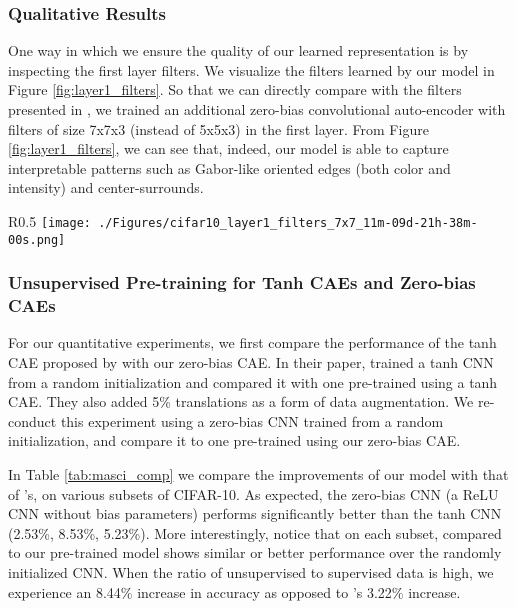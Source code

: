 \documentclass{article} \usepackage{iclr2015,times}
\begin{document}
\subsubsection{Qualitative Results}
One way in which we ensure the quality of our learned representation is by inspecting the first layer filters. We visualize the filters learned by our model in Figure \ref{fig:layer1_filters}. So that we can directly compare with the filters presented in \citet{masci2011stacked}, we trained an additional zero-bias convolutional auto-encoder with filters of size 7x7x3 (instead of 5x5x3) in the first layer. From Figure \ref{fig:layer1_filters}, we can see that, indeed, our model is able to capture interpretable patterns such as Gabor-like oriented edges (both color and intensity) and center-surrounds.

\begin{wrapfigure}{R}{0.5\textwidth}
\centering
\texttt{[image: ./Figures/cifar10\_layer1\_filters\_7x7\_11m-09d-21h-38m-00s.png]}
\caption{First layer filters learned by our zero-bias convolutional auto-encoder. Each filter has dimension 7x7x3. (Best viewed in color.) For direct comparison with tanh CAE please see \citet{masci2011stacked} Figure 2c.}
\label{fig:layer1_filters}
\vspace{-0.5cm}
\end{wrapfigure}

\subsubsection{Unsupervised Pre-training for Tanh CAEs and Zero-bias CAEs}

For our quantitative experiments, we first compare the performance of the tanh CAE proposed by \citet{masci2011stacked} with our zero-bias CAE. In their paper, \citet{masci2011stacked} trained a tanh CNN from a random initialization and compared it with one pre-trained using a tanh CAE. They also added 5\% translations as a form of data augmentation. We re-conduct this experiment using a zero-bias CNN trained from a random initialization, and compare it to one pre-trained using our zero-bias CAE.

In Table \ref{tab:masci_comp} we compare the improvements of our model with that of \citet{masci2011stacked}'s, on various subsets of CIFAR-10. As expected, the zero-bias CNN (a ReLU CNN without bias parameters) performs significantly better than the tanh CNN (2.53\%, 8.53\%, 5.23\%). More interestingly, notice that on each subset, compared to \citet{masci2011stacked} our pre-trained model shows similar or better performance over the randomly initialized CNN.  When the ratio of unsupervised to supervised data is high, we experience an 8.44\% increase in accuracy as opposed to \citet{masci2011stacked}'s 3.22\% increase.
\end{document}
